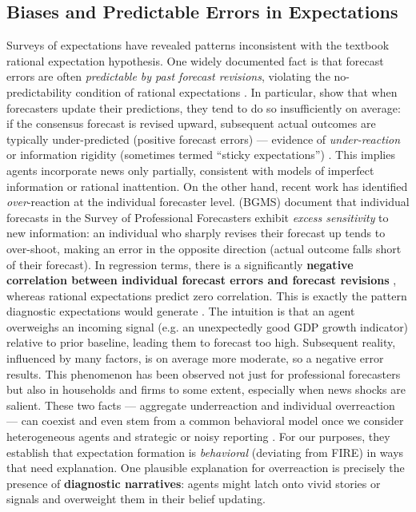 \documentclass[12pt]{article}
\begin{document}
\subsection*{Biases and Predictable Errors in Expectations}
Surveys of expectations have revealed patterns inconsistent with the textbook rational expectation hypothesis. One widely documented fact is that forecast errors are often \emph{predictable by past forecast revisions}, violating the no-predictability condition of rational expectations \citep{GEMMI2026103868}. In particular, \citet{CoibionGorodnichenko2015} show that when forecasters update their predictions, they tend to do so insufficiently on average: if the consensus forecast is revised upward, subsequent actual outcomes are typically under-predicted (positive forecast errors) — evidence of \emph{under-reaction} or information rigidity (sometimes termed ``sticky expectations'') \citep{GEMMI2026103868}. This implies agents incorporate news only partially, consistent with models of imperfect information or rational inattention.
On the other hand, recent work has identified \emph{over}-reaction at the individual forecaster level. \citet{BordaloGennaioliMaShleifer2020} (BGMS) document that individual forecasts in the Survey of Professional Forecasters exhibit \textit{excess sensitivity} to new information: an individual who sharply revises their forecast up tends to over-shoot, making an error in the opposite direction (actual outcome falls short of their forecast). In regression terms, there is a significantly \textbf{negative correlation between individual forecast errors and forecast revisions} \citep{GEMMI2026103868}, whereas rational expectations predict zero correlation. This is exactly the pattern diagnostic expectations would generate \citep{BordaloGennaioliMaShleifer2020}. The intuition is that an agent overweighs an incoming signal (e.g. an unexpectedly good GDP growth indicator) relative to prior baseline, leading them to forecast too high. Subsequent reality, influenced by many factors, is on average more moderate, so a negative error results. This phenomenon has been observed not just for professional forecasters but also in households and firms to some extent, especially when news shocks are salient.
These two facts — aggregate underreaction and individual overreaction — can coexist and even stem from a common behavioral model once we consider heterogeneous agents and strategic or noisy reporting \citep{BordaloGennaioliMaShleifer2020, AngeletosLian2018}. For our purposes, they establish that expectation formation is \emph{behavioral} (deviating from FIRE) in ways that need explanation. One plausible explanation for overreaction is precisely the presence of \textbf{diagnostic narratives}: agents might latch onto vivid stories or signals and overweight them in their belief updating.
\end{document}
